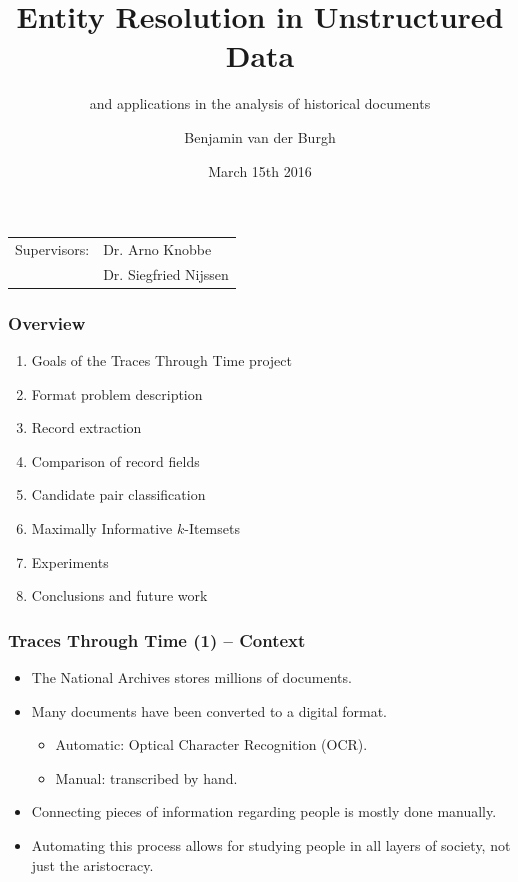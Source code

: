 \documentclass[12pt]{beamer}
\title{Entity Resolution in Unstructured Data}
\subtitle{and applications in the analysis of historical documents}
\author{Benjamin van der Burgh}
\date{March 15th 2016}
\theoremstyle{break}
\begin{document}
\begin{frame}[plain]
\maketitle

\begin{center}
	\footnotesize
	\begin{tabular}[t]{l l}
	Supervisors: & Dr. Arno Knobbe\\
	             & Dr. Siegfried Nijssen
	\end{tabular}%
\end{center}
\end{frame}




\begin{frame}
	\frametitle{Overview}
	
	\begin{enumerate}
		\item Goals of the Traces Through Time project
		\item Format problem description
		\item Record extraction
		\item Comparison of record fields
		\item Candidate pair classification
		\item Maximally Informative $k$-Itemsets
		\item Experiments
		\item Conclusions and future work
	\end{enumerate}
\end{frame}




\begin{frame}
	\frametitle{Traces Through Time (1) -- Context}
	
	\begin{itemize}
		\item The National Archives stores millions of documents.
		\item Many documents have been converted to a digital format. \begin{itemize}
				\item Automatic: Optical Character Recognition (OCR).
				\item Manual: transcribed by hand.
				\end{itemize} 
		\item Connecting pieces of information regarding people is mostly done manually.
		\item Automating this process allows for studying people in all layers of society, not just the aristocracy.
	\end{itemize}
	
\end{frame}
\end{document}
